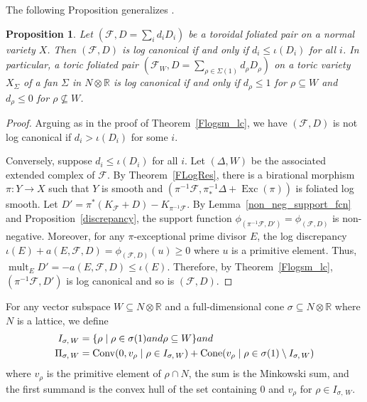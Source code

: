 \documentclass[12pt,reqno]{amsart}
\newtheorem{proposition}[theorem]{Proposition}
\theoremstyle{definition}
\newcommand{\on}{\operatorname}
\newcommand\cF{{\mathcal{F}}}
\newcommand\bR{{\mathbb R}}
\begin{document}
The following Proposition generalizes \cite[Lemma 3.1]{ambro2021positivity}. 
\begin{proposition}\label{lc}
    Let $(\cF,D=\sum_id_iD_i)$ be a toroidal foliated pair on a normal variety $X$. 
    Then $(\cF,D)$ is log canonical if and only if $d_i\leq\iota(D_i)$ for all $i$. 
    In particular, a toric foliated pair $(\cF_W,D=\sum_{\rho\in\Sigma(1)} d_\rho D_\rho)$ on a toric variety $X_\Sigma$ of a fan $\Sigma$ in $N\otimes\bR$ is log canonical if and only if $d_\rho\leq 1$ for $\rho\subseteq W$ and $d_\rho\leq 0$ for $\rho\nsubseteq W$. 
\end{proposition}
\begin{proof}
    Arguing as in the proof of Theorem~\ref{Flogsm_lc}, we have $(\cF,D)$ is not log canonical if $d_i>\iota(D_i)$ for some $i$. 

    Conversely, suppose $d_i\leq \iota(D_i)$ for all $i$. 
    Let $(\Delta,W)$ be the associated extended complex of $\cF$. 
    By Theorem~\ref{FLogRes}, there is a birational morphism $\pi\colon Y\to X$ such that $Y$ is smooth and $(\pi^{-1}\cF,\pi_*^{-1}\Delta+\on{Exc}(\pi))$ is foliated log smooth. 
    Let $D'=\pi^*(K_\cF+D)-K_{\pi^{-1}\cF}$. 
    By Lemma~\ref{non_neg_support_fcn} and Proposition~\ref{discrepancy}, the support function $\phi_{(\pi^{-1}\cF,D')} = \phi_{(\cF,D)}$ is non-negative. 
    Moreover, for any $\pi$-exceptional prime divisor $E$, the log discrepancy $\iota(E)+a(E,\cF,D) = \phi_{(\cF,D)}(u)\geq 0$ where $u$ is a primitive element. 
    Thus, $\on{mult}_E D'=-a(E,\cF,D)\leq\iota(E)$. 
    Therefore, by Theorem~\ref{Flogsm_lc}, $(\pi^{-1}\cF,D')$ is log canonical and so is $(\cF,D)$. 
\end{proof}


For any vector subspace $W\subseteq N \otimes\bR$ and a full-dimensional cone $\sigma\subseteq N \otimes\bR$ where $N$ is a lattice, we define 
\begin{align*}
    I_{\sigma,\,W} &=\{\rho\mid \rho\in\sigma(1)\textnormal{ and } \rho\subseteq W\}\textnormal{ and} \\
    \Pi_{\sigma,\,W} &= \on{Conv}(0, v_\rho\mid\rho\in I_{\sigma,\,W}) + \on{Cone}(v_\rho\mid\rho\in\sigma(1)\setminus I_{\sigma,\,W})
\end{align*}
where $v_\rho$ is the primitive element of $\rho\cap N$, the sum is the Minkowski sum, and the first summand is the convex hull of the set containing $0$ and $v_\rho$ for $\rho\in I_{\sigma,\,W}$. 
\end{document}
